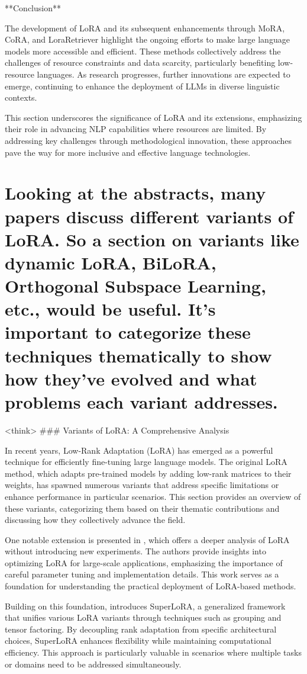 \documentclass[conference]{IEEEtran}
\begin{document}
**Conclusion**

The development of LoRA and its subsequent enhancements through MoRA, CoRA, and LoraRetriever highlight the ongoing efforts to make large language models more accessible and efficient. These methods collectively address the challenges of resource constraints and data scarcity, particularly benefiting low-resource languages. As research progresses, further innovations are expected to emerge, continuing to enhance the deployment of LLMs in diverse linguistic contexts.

This section underscores the significance of LoRA and its extensions, emphasizing their role in advancing NLP capabilities where resources are limited. By addressing key challenges through methodological innovation, these approaches pave the way for more inclusive and effective language technologies.

\section{Looking at the abstracts, many papers discuss different variants of LoRA. So a section on variants like dynamic LoRA, BiLoRA, Orthogonal Subspace Learning, etc., would be useful. It's important to categorize these techniques thematically to show how they've evolved and what problems each variant addresses.}
<think>
### Variants of LoRA: A Comprehensive Analysis

In recent years, Low-Rank Adaptation (LoRA) has emerged as a powerful technique for efficiently fine-tuning large language models. The original LoRA method, which adapts pre-trained models by adding low-rank matrices to their weights, has spawned numerous variants that address specific limitations or enhance performance in particular scenarios. This section provides an overview of these variants, categorizing them based on their thematic contributions and discussing how they collectively advance the field.

One notable extension is presented in \cite{b1}, which offers a deeper analysis of LoRA without introducing new experiments. The authors provide insights into optimizing LoRA for large-scale applications, emphasizing the importance of careful parameter tuning and implementation details. This work serves as a foundation for understanding the practical deployment of LoRA-based methods.

Building on this foundation, \cite{b2} introduces SuperLoRA, a generalized framework that unifies various LoRA variants through techniques such as grouping and tensor factoring. By decoupling rank adaptation from specific architectural choices, SuperLoRA enhances flexibility while maintaining computational efficiency. This approach is particularly valuable in scenarios where multiple tasks or domains need to be addressed simultaneously.
\end{document}
